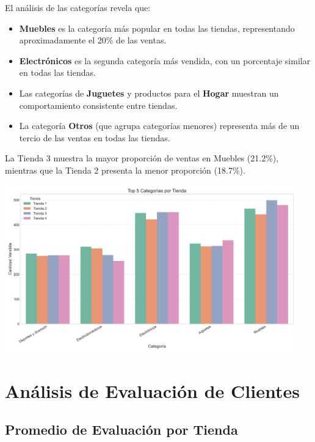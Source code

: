 \documentclass[12pt,a4paper]{report}\usepackage[spanish]{babel}\usepackage[utf8]{inputenc}\usepackage{graphicx}\usepackage{geometry}\usepackage{xcolor}\usepackage{tikz}\usepackage{pgfplots}\usepackage{booktabs}\usepackage{multicol}\usepackage{hyperref}\usepackage{pgf-pie}
\begin{document}
\begin{multicols}{2}
El análisis de las categorías revela que:

\begin{itemize}
    \item \textbf{Muebles} es la categoría más popular en todas las tiendas, representando aproximadamente el 20\% de las ventas.
    \item \textbf{Electrónicos} es la segunda categoría más vendida, con un porcentaje similar en todas las tiendas.
    \item Las categorías de \textbf{Juguetes} y productos para el \textbf{Hogar} muestran un comportamiento consistente entre tiendas.
    \item La categoría \textbf{Otros} (que agrupa categorías menores) representa más de un tercio de las ventas en todas las tiendas.
\end{itemize}

La Tienda 3 muestra la mayor proporción de ventas en Muebles (21.2\%), mientras que la Tienda 2 presenta la menor proporción (18.7\%).

\begin{center}
\includegraphics[width=0.95\textwidth]{2_categorias_populares_detalle.png}
\end{center}
\end{multicols}

\chapter{Análisis de Evaluación de Clientes}

\section{Promedio de Evaluación por Tienda}
\end{document}
